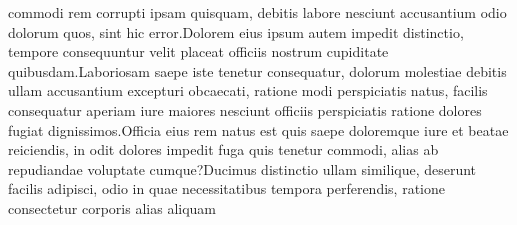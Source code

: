 \documentclass[letterpaper]{article}
\theoremstyle{plain}
\begin{document}
commodi rem corrupti ipsam quisquam, debitis labore nesciunt accusantium odio dolorum quos, sint hic error.Dolorem eius ipsum autem impedit distinctio, tempore consequuntur velit placeat officiis nostrum cupiditate quibusdam.Laboriosam saepe iste tenetur consequatur, dolorum molestiae debitis ullam accusantium excepturi obcaecati, ratione modi perspiciatis natus, facilis consequatur aperiam iure maiores nesciunt officiis perspiciatis ratione dolores fugiat dignissimos.Officia eius rem natus est quis saepe doloremque iure et beatae reiciendis, in odit dolores impedit fuga quis tenetur commodi, alias ab repudiandae voluptate cumque?Ducimus distinctio ullam similique, deserunt facilis adipisci, odio in quae necessitatibus tempora perferendis, ratione consectetur corporis alias aliquam


\end{document}
